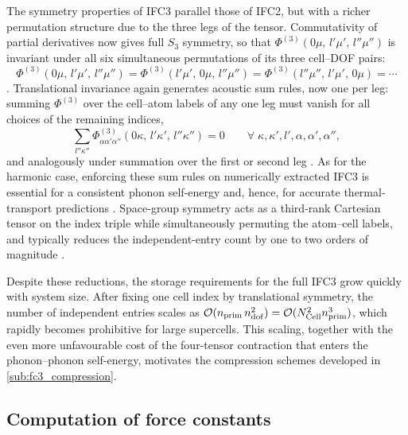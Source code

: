 The symmetry properties of IFC3 parallel those of IFC2, but with a
richer permutation structure due to the three legs of the
tensor.  Commutativity of partial derivatives now gives full $S_3$
symmetry, so that $\Phi^{(3)}(0\mu,\,l'\mu',\,l''\mu'')$ is
invariant under all six simultaneous permutations of its three
cell--DOF pairs:
\begin{equation}\label{eq:fc3_perm}
  \Phi^{(3)}(0\mu,\,l'\mu',\,l''\mu'')
  = \Phi^{(3)}(l'\mu',\,0\mu,\,l''\mu'')
  = \Phi^{(3)}(l''\mu'',\,l'\mu',\,0\mu)
  = \cdots
\end{equation}
\cite{srivastava_physics_2019}.  Translational
invariance again generates acoustic sum rules, now one per leg:
summing $\Phi^{(3)}$ over the cell--atom labels of any one leg must
vanish for all choices of the remaining indices,
\begin{equation}\label{eq:fc3_asr}
  \sum_{l''\kappa''}
     \Phi^{(3)}_{\alpha\alpha'\alpha''}(0\kappa,\,l'\kappa',\,l''\kappa'')
  = 0
  \qquad \forall\;\kappa,\kappa',l',\alpha,\alpha',\alpha'',
\end{equation}
and analogously under summation over the first or second leg
\cite{srivastava_physics_2019}.  As for the
harmonic case, enforcing these sum rules on numerically extracted
IFC3 is essential for a consistent phonon self-energy and, hence,
for accurate thermal-transport predictions \cite{li_shengbte_2014}.
Space-group symmetry acts as a third-rank Cartesian tensor on the
index triple while simultaneously permuting the atom--cell labels,
and typically reduces the independent-entry count by one to two
orders of magnitude \cite{fu_group_2019, seko_projector-based_2024,
esfarjani_method_2008}.

Despite these reductions, the storage requirements for the full IFC3
grow quickly with system size.  After fixing one cell index by
translational symmetry, the number of independent entries scales as
$\mathcal{O}(n_{\mathrm{prim}}\,n_{\mathrm{dof}}^2) = \mathcal{O}(N_{\mathrm{Cell}}^2n_{\mathrm{prim}}^3)$, which rapidly
becomes prohibitive for large supercells.  This scaling,
together with the even more unfavourable
cost of the four-tensor contraction that enters the phonon--phonon
self-energy, motivates the compression schemes developed in
\cref{sub:fc3_compression}.

\subsection{Computation of force constants}
\label{sub:fc_computation}

